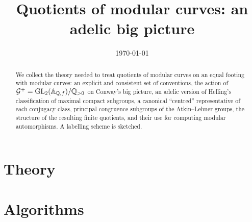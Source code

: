 \documentclass[11pt]{amsbook}
\title{Quotients of modular curves: an adelic big picture}
\date{\today}
\begin{document}
\begin{abstract}
We collect the theory needed to treat quotients of modular curves on an
equal footing with modular curves: an explicit and consistent set of
conventions, the action of $\AdelicGroup = \GL{2}{\FiniteAdeles{\QQ}}/\PositiveRationals$
on Conway's big picture, an adelic version of Helling's classification of
maximal compact subgroups, a canonical ``centred'' representative of each
conjugacy class, principal congruence subgroups of the Atkin--Lehner
groups, the structure of the resulting finite quotients, and their use for
computing modular automorphisms. A labelling scheme is sketched.
\end{abstract}

\maketitle
\tableofcontents

\chapter{Theory}\label{chap:theory}














\chapter{Algorithms}\label{chap:algorithms}



\appendix




\end{document}
